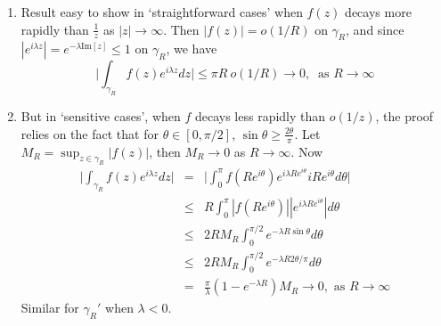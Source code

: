 \documentclass[a4paper]{article}
\begin{document}
\begin{remarks}\leavevmode
\begin{enumerate}
    \item Result easy to show in `straightforward cases' when $f(z)$ decays more rapidly than $\frac{1}{z}$ as $|z|\rightarrow\infty$. Then $|f(z)|=o(1/R)$ on $\gamma_R$, and since $|e^{i\lambda z}|=e^{-\lambda\text{Im}[z]}\leq 1$ on $\gamma_R$, we have
    $$\bigg|\int_{\gamma_R}f(z)e^{i\lambda z}dz\bigg|\leq\pi R~o(1/R)\rightarrow 0,~\text{ as }R\rightarrow\infty$$
    \item But in `sensitive cases', when $f$ decays less rapidly than $o(1/z)$, the proof relies on the fact that for $\theta\in[0,\pi/2]$, $\sin\theta\geq\frac{2\theta}{\pi}$. Let $M_R=\sup_{z\in\gamma_R}|f(z)|$, then $M_R\rightarrow 0$ as $R\rightarrow\infty$. Now
    \begin{eqnarray}
    \bigg|\int_{\gamma_R}f(z)e^{i\lambda z}dz\bigg|&=&\bigg|\int_0^\pi f(Re^{i\theta})e^{i\lambda Re^{i\theta}}iRe^{i\theta}d\theta\bigg|\nonumber\\&\leq& R\int_0^\pi|f(Re^{i\theta})||e^{i\lambda Re^{i\theta}}|d\theta\nonumber\\&\leq&2RM_R\int_0^{\pi/2}e^{-\lambda R\sin\theta}d\theta\nonumber\\&\leq&2RM_R\int_0^{\pi/2}e^{-\lambda R2\theta/\pi}d\theta\nonumber\\&=&\frac{\pi}{\lambda}(1-e^{-\lambda R})M_R\rightarrow 0,\text{ as }R\rightarrow\infty\nonumber
    \end{eqnarray}
    Similar for $\gamma_R'$ when $\lambda<0$.
\end{enumerate}
\end{remarks}
\end{document}
